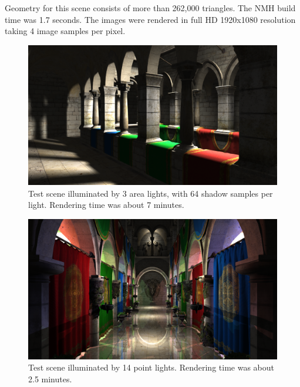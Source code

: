 Geometry for this scene consists of more than 262,000 triangles. The NMH build time was 1.7 seconds. The images were rendered in full HD 1920x1080 resolution taking 4 image samples per pixel.

\begin{figure}[htb]
  \begin{center}
    \includegraphics[width=\textwidth]{chapters/results/sponza_softshadows.png}
  \end{center}
  \caption{Test scene illuminated by 3 area lights, with 64 shadow samples per light. Rendering time was about 7 minutes.}
\end{figure}

\begin{figure}[htb]
  \begin{center}
    \includegraphics[width=\textwidth]{chapters/results/sponza_manypoint.png}
  \end{center}
  \caption{Test scene illuminated by 14 point lights. Rendering time was about 2.5 minutes.}
\end{figure}

